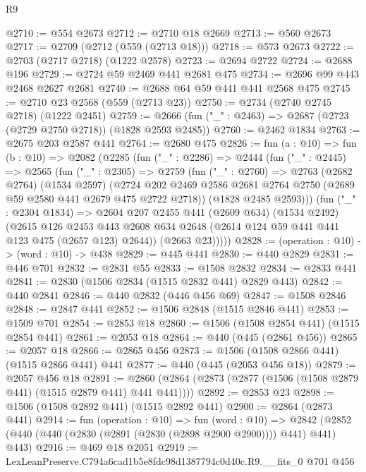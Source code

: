 \begin{lexlean}{R9}
\begin{coremodule}
@2710 := @554 @2673
@2712 := @2710 @18 @2669
@2713 := @560 @2673
@2717 := @2709 (@2712 (@559 (@2713 @18)))
@2718 := @573 @2673
@2722 := @2703 (@2717 @2718) (@1222 @2578)
@2723 := @2694 @2722
@2724 := @2688 @196
@2729 := @2724 @59 @2469 @441 @2681 @475
@2734 := @2696 @99 @443 @2468 @2627 @2681
@2740 := @2688 @64 @59 @441 @441 @2568 @475
@2745 := @2710 @23 @2568 (@559 (@2713 @23))
@2750 := @2734 (@2740 @2745 @2718) (@1222 @2451)
@2759 := @2666 (fun ("_" : @2463) => @2687 (@2723 (@2729 @2750 @2718)) (@1828 @2593 @2485))
@2760 := @2462 @1834
@2763 := @2675 @203 @2587 @441
@2764 := @2680 @475
@2826 := fun (a : @10) =>
  fun (b : @10) =>
  @2082
    (@2285
      (fun ("_" : @2286) =>
      @2444
        (fun ("_" : @2445) =>
        @2565
          (fun ("_" : @2305) =>
          @2759
            (fun ("_" : @2760) =>
            @2763
              (@2682 @2764)
              (@1534 @2597)
              (@2724
                @202
                @2469
                @2586
                @2681
                @2764
                @2750
                (@2689 @59 @2580 @441 @2679 @475 @2722 @2718))
              (@1828 @2485 @2593)))
          (fun ("_" : @2304 @1834) =>
          @2604
            @207
            @2455
            @441
            (@2609 @634)
            (@1534 @2492)
            (@2615
              @126
              @2453
              @443
              @2608
              @634
              @2648
              (@2614 @124 @59 @441 @441 @123 @475 (@2657 @123) @2644))
            (@2663 @23)))))
@2828 := (operation : @10) -> (word : @10) -> @438
@2829 := @445 @441
@2830 := @440 @2829
@2831 := @446 @701
@2832 := @2831 @55
@2833 := @1508 @2832
@2834 := @2833 @441
@2841 := @2830 (@1506 @2834 (@1515 @2832 @441) @2829 @443)
@2842 := @440 @2841
@2846 := @440 @2832 (@446 @456 @69)
@2847 := @1508 @2846
@2848 := @2847 @441
@2852 := @1506 @2848 (@1515 @2846 @441)
@2853 := @1509 @701
@2854 := @2853 @18
@2860 := @1506 (@1508 @2854 @441) (@1515 @2854 @441)
@2861 := @2053 @18
@2864 := @440 (@445 (@2861 @456))
@2865 := @2057 @18
@2866 := @2865 @456
@2873 := @1506 (@1508 @2866 @441) (@1515 @2866 @441) @441
@2877 := @440 (@445 (@2053 @456 @18))
@2879 := @2057 @456 @18
@2891 := @2860 (@2864 (@2873 (@2877 (@1506 (@1508 @2879 @441) (@1515 @2879 @441) @441 @441))))
@2892 := @2853 @23
@2898 := @1506 (@1508 @2892 @441) (@1515 @2892 @441)
@2900 := @2864 (@2873 @441)
@2914 := fun (operation : @10) =>
  fun (word : @10) =>
  @2842 (@2852 (@440 (@440 (@2830 (@2891 (@2830 (@2898 @2900 @2900)))) @441) @441) @443)
@2916 := @469 @18 @2051
@2919 := LexLeanPreserve.C794a6cad1b5e8fdc98d1387794c0d40c.R9.__fits_0 @701 @456

\end{coremodule}
\end{lexlean}
